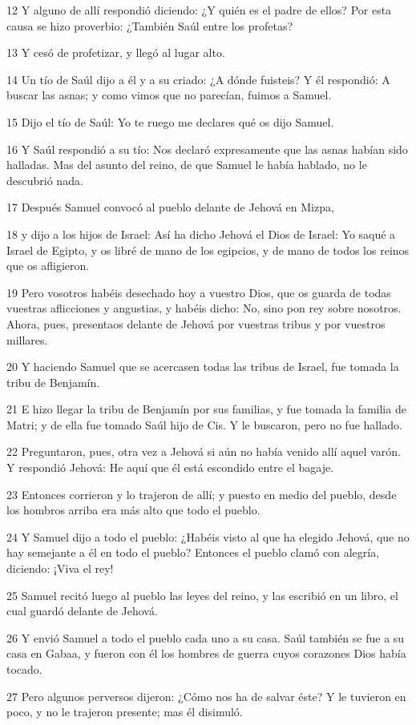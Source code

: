 \par 12 Y alguno de allí respondió diciendo: ¿Y quién es el padre de ellos? Por esta causa se hizo proverbio: ¿También Saúl entre los profetas?
\par 13 Y cesó de profetizar, y llegó al lugar alto.
\par 14 Un tío de Saúl dijo a él y a su criado: ¿A dónde fuisteis? Y él respondió: A buscar las asnas; y como vimos que no parecían, fuimos a Samuel.
\par 15 Dijo el tío de Saúl: Yo te ruego me declares qué os dijo Samuel.
\par 16 Y Saúl respondió a su tío: Nos declaró expresamente que las asnas habían sido halladas. Mas del asunto del reino, de que Samuel le había hablado, no le descubrió nada.
\par 17 Después Samuel convocó al pueblo delante de Jehová en Mizpa,
\par 18 y dijo a los hijos de Israel: Así ha dicho Jehová el Dios de Israel: Yo saqué a Israel de Egipto, y os libré de mano de los egipcios, y de mano de todos los reinos que os afligieron.
\par 19 Pero vosotros habéis desechado hoy a vuestro Dios, que os guarda de todas vuestras aflicciones y angustias, y habéis dicho: No, sino pon rey sobre nosotros. Ahora, pues, presentaos delante de Jehová por vuestras tribus y por vuestros millares.
\par 20 Y haciendo Samuel que se acercasen todas las tribus de Israel, fue tomada la tribu de Benjamín.
\par 21 E hizo llegar la tribu de Benjamín por sus familias, y fue tomada la familia de Matri; y de ella fue tomado Saúl hijo de Cis. Y le buscaron, pero no fue hallado.
\par 22 Preguntaron, pues, otra vez a Jehová si aún no había venido allí aquel varón. Y respondió Jehová: He aquí que él está escondido entre el bagaje.
\par 23 Entonces corrieron y lo trajeron de allí; y puesto en medio del pueblo, desde los hombros arriba era más alto que todo el pueblo.
\par 24 Y Samuel dijo a todo el pueblo: ¿Habéis visto al que ha elegido Jehová, que no hay semejante a él en todo el pueblo? Entonces el pueblo clamó con alegría, diciendo: ¡Viva el rey!
\par 25 Samuel recitó luego al pueblo las leyes del reino, y las escribió en un libro, el cual guardó delante de Jehová.
\par 26 Y envió Samuel a todo el pueblo cada uno a su casa. Saúl también se fue a su casa en Gabaa, y fueron con él los hombres de guerra cuyos corazones Dios había tocado.
\par 27 Pero algunos perversos dijeron: ¿Cómo nos ha de salvar éste? Y le tuvieron en poco, y no le trajeron presente; mas él disimuló.

